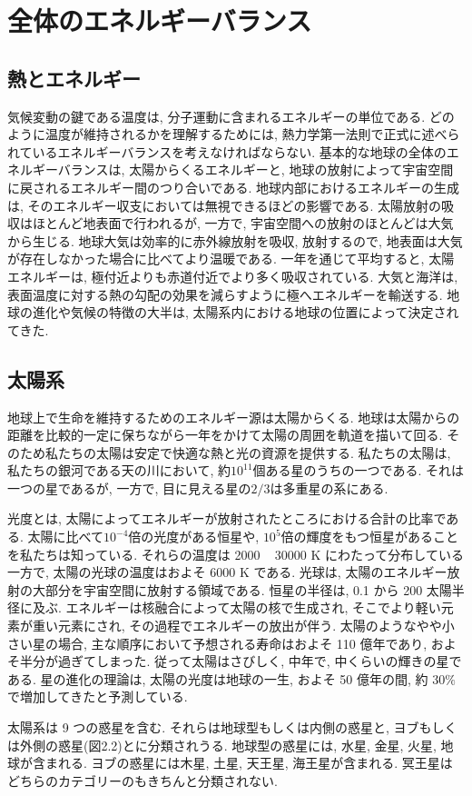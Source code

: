 \documentclass[a4j,12pt,openbib,oneside,dvipdfmx]{jbook}
\begin{document}

\chapter{全体のエネルギーバランス}	
\section{熱とエネルギー}
\par
気候変動の鍵である温度は, 分子運動に含まれるエネルギーの単位である. どのように温度が維持されるかを理解するためには, 熱力学第一法則で正式に述べられているエネルギーバランスを考えなければならない. 
基本的な地球の全体のエネルギーバランスは, 太陽からくるエネルギーと, 地球の放射によって宇宙空間に戻されるエネルギー間のつり合いである. 地球内部におけるエネルギーの生成は, そのエネルギー収支においては無視できるほどの影響である. 
太陽放射の吸収はほとんど地表面で行われるが, 一方で, 宇宙空間への放射のほとんどは大気から生じる. 地球大気は効率的に赤外線放射を吸収, 放射するので, 地表面は大気が存在しなかった場合に比べてより温暖である. 
一年を通じて平均すると, 太陽エネルギーは, 極付近よりも赤道付近でより多く吸収されている. 大気と海洋は, 表面温度に対する熱の勾配の効果を減らすように極へエネルギーを輸送する. 地球の進化や気候の特徴の大半は, 太陽系内における地球の位置によって決定されてきた.

\newpage
\section{太陽系}
\par
地球上で生命を維持するためのエネルギー源は太陽からくる. 地球は太陽からの距離を比較的一定に保ちながら一年をかけて太陽の周囲を軌道を描いて回る. そのため私たちの太陽は安定で快適な熱と光の資源を提供する. 私たちの太陽は, 私たちの銀河である天の川において, 約$10^{11}$個ある星のうちの一つである. それは一つの星であるが, 一方で, 目に見える星の$2/3$は多重星の系にある.
\par
光度とは, 太陽によってエネルギーが放射されたところにおける合計の比率である. 
太陽に比べて$10^{-4}$倍の光度がある恒星や, $10^5$倍の輝度をもつ恒星があることを私たちは知っている. それらの温度は 2000 ~ 30000 K にわたって分布している一方で, 太陽の光球の温度はおよそ 6000 K である. 
光球は, 太陽のエネルギー放射の大部分を宇宙空間に放射する領域である. 恒星の半径は, 0.1 から 200 太陽半径に及ぶ. エネルギーは核融合によって太陽の核で生成され, そこでより軽い元素が重い元素にされ, その過程でエネルギーの放出が伴う.
太陽のようなやや小さい星の場合, 主な順序において予想される寿命はおよそ 110 億年であり, およそ半分が過ぎてしまった. 従って太陽はさびしく, 中年で, 中くらいの輝きの星である. 
星の進化の理論は, 太陽の光度は地球の一生, およそ 50 億年の間, 約 30$\%$で増加してきたと予測している. 
\par
太陽系は 9 つの惑星を含む. それらは地球型もしくは内側の惑星と, ヨブもしくは外側の惑星(図2.2)とに分類されうる. 地球型の惑星には, 水星, 金星, 火星, 地球が含まれる. ヨブの惑星には木星, 土星, 天王星, 海王星が含まれる. 冥王星はどちらのカテゴリーのもきちんと分類されない. \\
\end{document}
